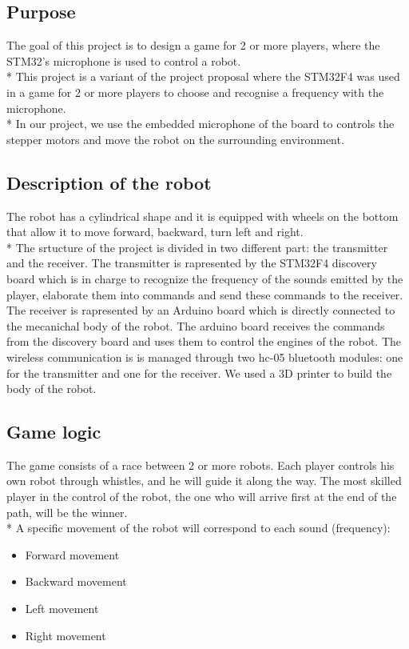 \subsection{Purpose}
The goal of this project is to design a game for 2 or more players, where the STM32’s microphone is used to control a robot.\\*
This project is a variant of the project proposal where the STM32F4 was used in a game for 2 or more players to choose and recognise a frequency with the microphone.\\*
In our project, we use the embedded microphone of the board to controls the stepper motors and move the robot on the surrounding environment.

\subsection{Description of the robot}
The robot has a cylindrical shape and it is equipped with wheels on the bottom that allow it to move forward, backward, turn left and right.\\*
The srtucture of the project is divided in two different part: the transmitter and the receiver.
The transmitter is rapresented by the STM32F4 discovery board which is in charge to recognize the frequency of the sounds emitted by the player, elaborate them into commands and send these commands to the receiver.
The receiver is rapresented by an Arduino board which is directly connected to the mecanichal body of the robot. The arduino board receives the commands from the discovery board and uses them to control the engines of the robot.
The wireless communication is is managed through two hc-05 bluetooth modules: one for the transmitter and one for the receiver.
We used a 3D printer to build the body of the robot. 

\subsection{Game logic}
The game consists of a race between 2 or more robots. Each player controls his own robot through whistles, and he will guide it along the way. The most skilled player in the control of the robot, the one who will arrive first at the end of the path, will be the winner.\\*
A specific movement of the robot will correspond to each sound (frequency):
\begin{itemize}
	\item Forward movement
	\item Backward movement
	\item Left movement
	\item Right movement
\end{itemize}


